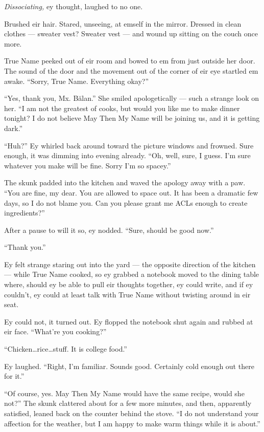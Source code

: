 \emph{Dissociating,} ey thought, laughed to no one.

Brushed eir hair. Stared, unseeing, at emself in the mirror. Dressed in clean clothes — sweater vest? Sweater vest — and wound up sitting on the couch once more.

True Name peeked out of eir room and bowed to em from just outside her door. The sound of the door and the movement out of the corner of eir eye startled em awake. ``Sorry, True Name. Everything okay?''

``Yes, thank you, Mx. Bălan.'' She smiled apologetically — such a strange look on her. ``I am not the greatest of cooks, but would you like me to make dinner tonight? I do not believe May Then My Name will be joining us, and it is getting dark.''

``Huh?'' Ey whirled back around toward the picture windows and frowned. Sure enough, it was dimming into evening already. ``Oh, well, sure, I guess. I'm sure whatever you make will be fine. Sorry I'm so spacey.''

The skunk padded into the kitchen and waved the apology away with a paw. ``You are fine, my dear. You are allowed to space out. It has been a dramatic few days, so I do not blame you. Can you please grant me ACLs enough to create ingredients?''

After a pause to will it so, ey nodded. ``Sure, should be good now.''

``Thank you.''

Ey felt strange staring out into the yard — the opposite direction of the kitchen — while True Name cooked, so ey grabbed a notebook moved to the dining table where, should ey be able to pull eir thoughts together, ey could write, and if ey couldn't, ey could at least talk with True Name without twisting around in eir seat.

Ey could not, it turned out. Ey flopped the notebook shut again and rubbed at eir face. ``What're you cooking?''

``Chicken\ldots rice\ldots stuff. It is college food.''

Ey laughed. ``Right, I'm familiar. Sounds good. Certainly cold enough out there for it.''

``Of course, yes. May Then My Name would have the same recipe, would she not?'' The skunk clattered about for a few more minutes, and then, apparently satisfied, leaned back on the counter behind the stove. ``I do not understand your affection for the weather, but I am happy to make warm things while it is about.''

